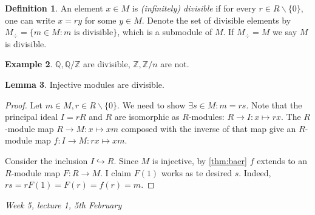 \documentclass{article}
\newcommand{\Z}{\mathbb{Z}}
\newcommand{\Q}{\mathbb{Q}}
\theoremstyle{definition}
\newtheorem{defn}{Definition}[subsection]
\newtheorem{lemma}[defn]{Lemma}
\newtheorem{example}[defn]{Example}
\begin{document}
\begin{defn}
An element $x\in M$ is \textit{(infinitely) divisible} if for every $r\in R\backslash\{0\}$, one can write $x=ry$ for some $y\in M$. Denote the set of divisible elements by $M_\div=\{m\in M:m\text{ is divisible}\}$, which is a submodule of $M$. If $M_\div=M$ we say $M$ is divisible.
\end{defn}

\begin{example}
$\Q,\Q/\Z$ are divisible, $\Z,\Z/n$ are not.
\end{example}

\begin{lemma}
\label{lemma:injmodarediv}
Injective modules are divisible.
\end{lemma}
\begin{proof}
Let $m\in M,r\in R\backslash\{0\}$. We need to show $\exists s\in M:m=rs$. Note that the principal ideal $I=rR$ and $R$ are isomorphic as $R$-modules: $R\rightarrow I:x\mapsto rx$. The $R$-module map $R\rightarrow M:x\mapsto xm$ composed with the inverse of that map give an $R$-module map $f:I\rightarrow M:rx\mapsto xm$.

Consider the inclusion $I\hookrightarrow R$. Since $M$ is injective, by \ref{thm:baer} $f$ extends to an $R$-module map $F:R\rightarrow M$. I claim $F(1)$ works as te desired $s$. Indeed, $rs=rF(1)=F(r)=f(r)=m$.
\end{proof}

\begin{flushright}
\textit{Week 5, lecture 1, 5th February}
\end{flushright}
\end{document}
